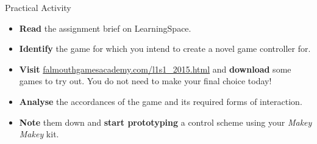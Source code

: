 \documentclass[xcolor={dvipsnames}]{beamer}\usepackage{etoolbox}\newtoggle{printable}\togglefalse{printable}
\begin{document}
\begin{frame}{Practical Activity}
	\begin{itemize}
		\item \textbf{Read} the assignment brief on LearningSpace.
		\item \textbf{Identify} the game for which you intend to create a novel game controller for.
		\item \textbf{Visit} \url{falmouthgamesacademy.com/l1s1_2015.html} 
		and \textbf{download} some games to try out. You do not need to make your final choice today!
		\item \textbf{Analyse} the accordances of the game and its required forms of interaction.
		\item \textbf{Note} them down and \textbf{start prototyping} a control scheme using your \textit{Makey Makey} kit.
	\end{itemize}
\end{frame}


%
\end{document}
